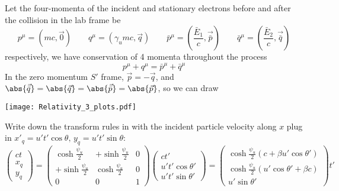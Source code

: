 \documentclass[12pt]{article}
\begin{document}
\section{}
\subsection{} Let the four-momenta of the incident and stationary electrons before and after the collision in the lab frame be \[
            p^\mu = (m c, \vec{0}) \qquad q^\mu = (\gamma_u m c, \vec{q})\qquad \bar{p}^\mu =(\frac{\bar{E}_1}{c}, \vec{\bar{p}}) \qquad\bar{q}^\mu=(\frac{\bar{E}_2}{c}, \vec{\bar{q}})
        \]
        respectively, we have conservation of 4 momenta throughout the process \[
            p^\mu + q^\mu = \bar{p}^\mu +\bar{q}^\mu
        \]
        In the zero momentum \(S'\) frame, \(\vec{p} = -\vec{q}\), and \( \abs{\vec{\bar{q}}} = \abs{\vec{q}} =\abs{\vec{\bar{p}}} = \abs{\vec{p}}\), so we can draw
        \begin{center}
            \texttt{[image: Relativity\_3\_plots.pdf]}
        \end{center}
        Write down the transform rules in with the incident particle velocity along \(x\) plug in \(x'_q=u't'\cos\theta,\, y_q=u't'\sin\theta \):
        \[
            \begin{pmatrix}
                ct\\
                x_q\\
                y_q
            \end{pmatrix} =
            \begin{pmatrix}
                \cosh{\frac{\psi_u}{2}} & + \sinh{\frac{\psi_u}{2}}&0\\
                +\sinh{\frac{\psi_u}{2}} & \cosh{\frac{\psi_u}{2}}&0\\
                0&0&1
            \end{pmatrix}
            \begin{pmatrix}
                ct'\\
                u't'\cos \theta'\\
                u't'\sin\theta'
            \end{pmatrix} =
            \begin{pmatrix}
                \cosh{\frac{\psi_u}{2}} (c + \beta u'\cos \theta')\\
                \cosh{\frac{\psi_u}{2}} (u'\cos \theta' + \beta c) \\
                u'\sin \theta'
            \end{pmatrix}t'
        \]
\end{document}
